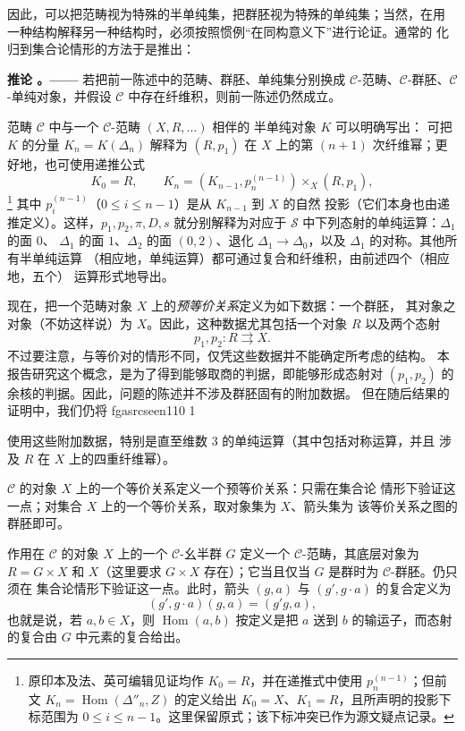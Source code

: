 \documentclass[12pt,twoside,openany]{book}
\numberwithin{equation}{section}
\newcommand{\fgaunitid}{unbound}
\newcommand{\src}[1]{%
  \phantomsection
  \hypertarget{src:\fgaunitid:#1}{}%
  \hypertarget{fga.\fgaunitid.p#1}{}%
  \ifcsname fgasrcseen#1\endcsname\else
    \expandafter\gdef\csname fgasrcseen#1\endcsname{1}%
    \hypertarget{src:#1}{}%
  \fi
  \marginpar{\raggedleft\footnotesize\sffamily #1}%
}
\theoremstyle{plain}
\theoremstyle{definition}
\theoremstyle{remark}
\newcommand{\result}[2]{%
  \par\medskip\noindent\textbf{#1%
  \if\relax\detokenize{#2}\relax\else\space#2\fi。——}\enspace
}
\begin{document}
因此，可以把范畴视为特殊的半单纯集，把群胚视为特殊的单纯集；当然，在用
一种结构解释另一种结构时，必须按照惯例“在同构意义下”进行论证。通常的
化归到集合论情形的方法于是推出：

\result{推论}{4.2} 若把前一陈述中的范畴、群胚、单纯集分别换成
$\mathcal C$-范畴、$\mathcal C$-群胚、$\mathcal C$-单纯对象，并假设
$\mathcal C$ 中存在纤维积，则前一陈述仍然成立。

范畴 $\mathcal C$ 中与一个 $\mathcal C$-范畴 $(X,R,\ldots)$ 相伴的
半单纯对象 $K$ 可以明确写出：
可把 $K$ 的分量 $K_n=K(\Delta_n)$ 解释为 $(R,p_1)$ 在 $X$ 上的第
$(n+1)$ 次纤维幂；更好地，也可使用递推公式
\[
  K_0=R,\qquad
  K_n=(K_{n-1},p_n^{(n-1)})\times_X(R,p_1),
\]
\footnote{原印本及法、英可编辑见证均作 $K_0=R$，并在递推式中使用
$p_n^{(n-1)}$；但前文 $K_n=\operatorname{Hom}(\Delta''_n,Z)$ 的定义给出
$K_0=X$、$K_1=R$，且所声明的投影下标范围为
$0\leq i\leq n-1$。这里保留原式；该下标冲突已作为源文疑点记录。}
其中 $p_i^{(n-1)}$（$0\leq i\leq n-1$）是从 $K_{n-1}$ 到 $X$ 的自然
投影（它们本身也由递推定义）。这样，$p_1,p_2,\pi,D,s$ 就分别解释为对应于
$\mathcal S$ 中下列态射的单纯运算：$\Delta_1$ 的面 $0$、
$\Delta_1$ 的面 $1$、$\Delta_2$ 的面 $(0,2)$、退化
$\Delta_1\to\Delta_0$，以及 $\Delta_1$ 的对称。其他所有半单纯运算
（相应地，单纯运算）都可通过复合和纤维积，由前述四个（相应地，五个）
运算形式地导出。

现在，把一个范畴对象 $X$ 上的\emph{预等价关系}定义为如下数据：一个群胚，
其对象之对象（不妨这样说）为 $X$。因此，这种数据尤其包括一个对象 $R$
以及两个态射
\[
  p_1,p_2:R\rightrightarrows X.
\]
不过要注意，与等价对的情形不同，仅凭这些数据并不能确定所考虑的结构。
本报告研究这个概念，是为了得到能够取商的判据，即能够形成态射对
$(p_1,p_2)$ 的余核的判据。因此，问题的陈述并不涉及群胚固有的附加数据。
但在随后结果的证明中，我们仍将
\src{110}
使用这些附加数据，特别是直至维数 $3$ 的单纯运算（其中包括对称运算，并且
涉及 $R$ 在 $X$ 上的四重纤维幂）。

$\mathcal C$ 的对象 $X$ 上的一个等价关系定义一个预等价关系：只需在集合论
情形下验证这一点；对集合 $X$ 上的一个等价关系，取对象集为 $X$、箭头集为
该等价关系之图的群胚即可。

作用在 $\mathcal C$ 的对象 $X$ 上的一个 $\mathcal C$-幺半群 $G$ 定义一个
$\mathcal C$-范畴，其底层对象为 $R=G\times X$ 和 $X$（这里要求
$G\times X$ 存在）；它当且仅当 $G$ 是群时为 $\mathcal C$-群胚。仍只须在
集合论情形下验证这一点。此时，箭头 $(g,a)$ 与 $(g',g\cdot a)$ 的复合定义为
\[
  (g',g\cdot a)(g,a)=(g'g,a),
\]
也就是说，若 $a,b\in X$，则 $\operatorname{Hom}(a,b)$ 按定义是把 $a$
送到 $b$ 的输运子，而态射的复合由 $G$ 中元素的复合给出。
\end{document}
